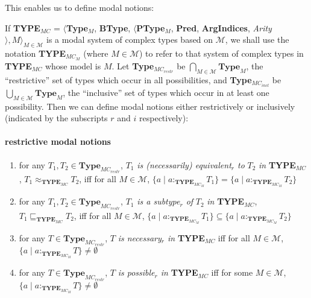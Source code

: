 This enables us to define modal notions:

If {\bf TYPE$_{\mathit{MC}}$} = $\langle${\bf Type}$_M$, {\bf BType},
$\langle$\textbf{PType}$_M$, {\bf Pred}, \textbf{ArgIndices}, {\it Arity\/}$\rangle, M\rangle_{M\in\mathcal{M}}$
is a modal system of complex types based
on $\mathcal{M}$, we shall use the notation {\bf
  TYPE$_{\mathit{MC}_M}$} (where $M\in\mathcal{M}$) to refer to that
system of complex types in {\bf TYPE$_{\mathit{MC}}$} whose model is
$M$.  Let \textbf{Type}$_{\mathit{MC}_{\mathit{restr}}}$ be
  $\bigcap\limits_{M\in\mathcal{M}}\!\textbf{Type}_M$, the
  ``restrictive'' set of
  types which occur in all possibilities,  and \textbf{Type}$_{\mathit{MC}_{\mathit{incl}}}$ be
  $\bigcup\limits_{M\in\mathcal{M}}\!\textbf{Type}_M$, the
  ``inclusive'' set of
  types which occur in at least one possibility.  Then we can define
  modal notions either restrictively or inclusively (indicated by the
  subscripts $r$ and $i$ respectively):

\paragraph{restrictive modal notions}  
\begin{enumerate} 
 
\item for any $T_1,T_2\in\textbf{Type}_{\mathit{MC}_{\mathit{restr}}}$, $T_1$ \textit{is
    (necessarily) equivalent$_r$
    to} $T_2$ \textit{in} {\bf TYPE$_{\mathit{MC}}$},
  $T_1\approx_{\mathbf{TYPE_{\mathit{MC}}}}T_2$,  iff for all
  $M\in\mathcal{M}$, $\{a\mid a:_{\mathbf{TYPE}_{\mathit{MC}_M}}T_1\}=\{a\mid a:_{\mathbf{TYPE}_{\mathit{MC}_M}}T_2\}$
  
 
\item for any $T_1,T_2\in\textbf{Type}_{\mathit{MC}_{\mathit{restr}}}$, $T_1$ \textit{is a subtype$_r$ of} $T_2$ \textit{in} {\bf TYPE$_{\mathit{MC}}$},
  $T_1\sqsubseteq_{\mathbf{TYPE_{\mathit{MC}}}}T_2$,  iff for all
  $M\in\mathcal{M}$, $\{a\mid a:_{\mathbf{TYPE}_{\mathit{MC}_M}}T_1\}\subseteq\{a\mid a:_{\mathbf{TYPE}_{\mathit{MC}_M}}T_2\}$

\item for any $T\in\textbf{Type}_{\mathit{MC}_{\mathit{restr}}}$, $T$ \textit{is necessary$_r$ in} {\bf TYPE$_{\mathit{MC}}$}  iff for all
  $M\in\mathcal{M}$, \\ $\{a\mid a:_{\mathbf{TYPE}_{\mathit{MC}_M}}T\}\not=\emptyset$

\item for any $T\in\textbf{Type}_{\mathit{MC}_{\mathit{restr}}}$, $T$ \textit{is possible$_r$ in} {\bf TYPE$_{\mathit{MC}}$}  iff for some
  $M\in\mathcal{M}$, \\ $\{a\mid a:_{\mathbf{TYPE}_{\mathit{MC}_M}}T\}\not=\emptyset$
 
\end{enumerate}


